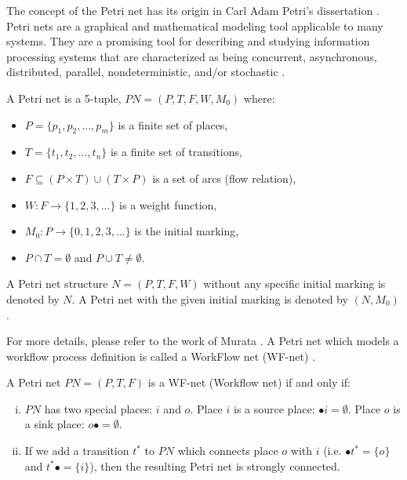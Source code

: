 \documentclass{llncs}
\begin{document}
The concept of the Petri net has its origin in Carl Adam Petri's dissertation \cite{petri1966kommunikation}. Petri nets are a graphical and mathematical modeling tool applicable to many systems. They are a promising tool for describing and studying information processing systems that are characterized as being concurrent, asynchronous, distributed, parallel, nondeterministic, and/or stochastic \cite{murata1989petri}.

\begin{definition}\label{def:petrinet}
A Petri net is a 5-tuple, $PN=(P,T,F,W,M_{0})$ where:
	\begin{itemize}
		\item[] $P=\{p_{1},p_{2},...,p_{m}\}$ is a finite set of places,
		\item[] $T=\{t_{1},t_{2},...,t_{n}\}$ is a finite set of transitions,
		\item[] $F\subseteq(P\times T)\cup(T\times P)$ is a set of arcs (flow relation),
		\item[] $W:F\rightarrow\{1,2,3,...\}$ is a weight function,
		\item[] $M_{0}:P\rightarrow\{0,1,2,3,...\}$ is the initial marking,
		\item[] $P\cap T=\emptyset$ and $P\cup T\neq\emptyset$.
	\end{itemize}
A Petri net structure $N=(P,T,F,W)$ without any specific initial marking is denoted by $N$. A Petri net with the given initial marking is denoted by $(N,M_{0})$.
\end{definition}

For more details, please refer to the work of Murata \cite{murata1989petri}. A Petri net which models a workflow process definition is called a WorkFlow net (WF-net) \cite{van1998application}.

\begin{definition}[WF-net]\label{def:wfnet}
A Petri net $PN=(P,T,F)$ is a WF-net (Workflow net) if and only if:
	\begin{enumerate}[(i)]
		\item $PN$ has two special places: $i$ and $o$. Place $i$ is a source place: $\bullet i=\emptyset$. Place $o$ is a sink place: $o\bullet =\emptyset$.
		\item If we add a transition $t^{*}$ to $PN$ which connects place $o$ with $i$ (i.e. $\bullet t^{*}=\{o\}$ and $t^{*}\bullet=\{i\}$), then the resulting Petri net is strongly connected.
	\end{enumerate}
\end{definition}
\end{document}
